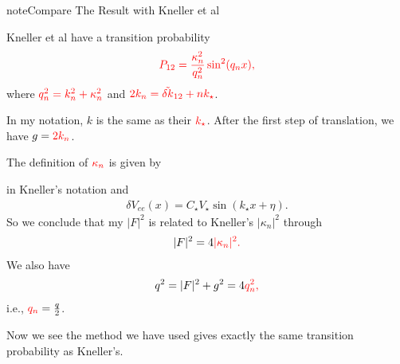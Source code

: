 \documentclass[letterpaper,12pt,english]{sphinxmanual}
\begin{document}
\begin{sphinxadmonition}{note}{Compare The Result with Kneller et al}

Kneller et al have a transition probability
\begin{equation*}
\begin{split}\color{red}P_{12} = \frac{\kappa_n^2}{q_n^2} \sin^2 (q_n x),\end{split}
\end{equation*}
where \(\color{red}q_n^2 = k_n^2 + \kappa_n^2\) and \(\color{red}2k_n = \tilde{\delta k}_{12} + n k_\star\).

In my notation, \(k\) is the same as their \(\color{red}k_\star\). After the first step of translation, we have \(g = \color{red} 2 k_n\).

The definition of \(\color{red}\kappa_n\) is given by

in Kneller's notation and
\begin{equation*}
\begin{split}\delta V_{ee}(x) = C_\star V_\star \sin (k_\star x + \eta).\end{split}
\end{equation*}
So we conclude that my \(\lvert F \rvert ^2\) is related to Kneller's \(\lvert \kappa_n \rvert^2\) through
\begin{equation*}
\begin{split}\lvert F \rvert^2 = 4 \color{red} \lvert \kappa_n \rvert^2.\end{split}
\end{equation*}
We also have
\begin{equation*}
\begin{split}q^2 = \lvert F \rvert ^2 + g^2  = 4 \color{red} q_n^2,\end{split}
\end{equation*}
i.e., \({\color{red}q_n} = \frac{ q }{2}\).

Now we see the method we have used gives exactly the same transition probability as Kneller's.
\end{sphinxadmonition}
\end{document}
